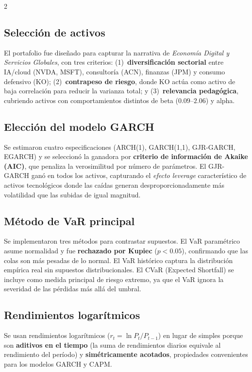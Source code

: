 \documentclass[10pt,a4paper]{article}
\begin{document}
\begin{multicols}{2}

\subsection{Selección de activos}

El portafolio fue diseñado para capturar la narrativa de \emph{Economía Digital y Servicios Globales}, con tres criterios: (1)~\textbf{diversificación sectorial} entre IA/cloud (NVDA, MSFT), consultoría (ACN), finanzas (JPM) y consumo defensivo (KO); (2)~\textbf{contrapeso de riesgo}, donde KO actúa como activo de baja correlación para reducir la varianza total; y (3)~\textbf{relevancia pedagógica}, cubriendo activos con comportamientos distintos de beta ($0.09$--$2.06$) y alpha.

\subsection{Elección del modelo GARCH}

Se estimaron cuatro especificaciones (ARCH(1), GARCH(1,1), GJR-GARCH, EGARCH) y se seleccionó la ganadora por \textbf{criterio de información de Akaike (AIC)}, que penaliza la verosimilitud por número de parámetros. El GJR-GARCH ganó en todos los activos, capturando el \emph{efecto leverage} característico de activos tecnológicos donde las caídas generan desproporcionadamente más volatilidad que las subidas de igual magnitud.

\columnbreak

\subsection{Método de VaR principal}

Se implementaron tres métodos para contrastar supuestos. El VaR paramétrico asume normalidad y fue \textbf{rechazado por Kupiec} ($p<0.05$), confirmando que las colas son más pesadas de lo normal. El VaR histórico captura la distribución empírica real sin supuestos distribucionales. El CVaR (Expected Shortfall) se incluye como medida principal de riesgo extremo, ya que el VaR ignora la severidad de las pérdidas más allá del umbral.

\subsection{Rendimientos logarítmicos}

Se usan rendimientos logarítmicos ($r_t = \ln P_t/P_{t-1}$) en lugar de simples porque son \textbf{aditivos en el tiempo} (la suma de rendimientos diarios equivale al rendimiento del período) y \textbf{simétricamente acotados}, propiedades convenientes para los modelos GARCH y CAPM.

\end{multicols}
\end{document}
